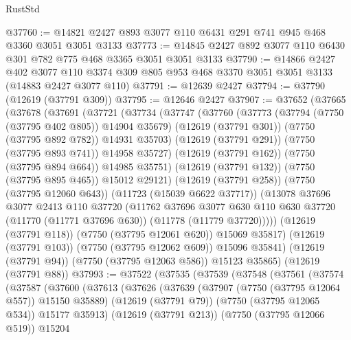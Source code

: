 \begin{lexlean}{RustStd}
\begin{coremodule}
@37760 := @14821 @2427 @893 @3077 @110 @6431 @291 @741 @945 @468 @3360 @3051 @3051 @3133
@37773 := @14845 @2427 @892 @3077 @110 @6430 @301 @782 @775 @468 @3365 @3051 @3051 @3133
@37790 := @14866
    @2427
    @402
    @3077
    @110
    @3374
    @309
    @805
    @953
    @468
    @3370
    @3051
    @3051
    @3133
    (@14883 @2427 @3077 @110)
@37791 := @12639 @2427
@37794 := @37790 (@12619 (@37791 @309))
@37795 := @12646 @2427
@37907 := @37652
    (@37665
      (@37678
        (@37691
          (@37721
            (@37734
              (@37747
                (@37760
                  (@37773
                    (@37794 (@7750 (@37795 @402 @805)) @14904 @35679)
                    (@12619 (@37791 @301))
                    (@7750 (@37795 @892 @782))
                    @14931
                    @35703)
                  (@12619 (@37791 @291))
                  (@7750 (@37795 @893 @741))
                  @14958
                  @35727)
                (@12619 (@37791 @162))
                (@7750 (@37795 @894 @664))
                @14985
                @35751)
              (@12619 (@37791 @132))
              (@7750 (@37795 @895 @465))
              @15012
              @29121)
            (@12619 (@37791 @258))
            (@7750 (@37795 @12060 @643))
            (@11723 (@15039 @6622 @37717))
            (@13078
              @37696
              @3077
              @2413
              @110
              @37720
              (@11762
                @37696
                @3077
                @630
                @110
                @630
                @37720
                (@11770 (@11771 @37696 @630))
                (@11778 (@11779 @37720)))))
          (@12619 (@37791 @118))
          (@7750 (@37795 @12061 @620))
          @15069
          @35817)
        (@12619 (@37791 @103))
        (@7750 (@37795 @12062 @609))
        @15096
        @35841)
      (@12619 (@37791 @94))
      (@7750 (@37795 @12063 @586))
      @15123
      @35865)
    (@12619 (@37791 @88))
@37993 := @37522
    (@37535
      (@37539
        (@37548
          (@37561
            (@37574
              (@37587
                (@37600
                  (@37613
                    (@37626
                      (@37639
                        (@37907 (@7750 (@37795 @12064 @557)) @15150 @35889)
                        (@12619 (@37791 @79))
                        (@7750 (@37795 @12065 @534))
                        @15177
                        @35913)
                      (@12619 (@37791 @213))
                      (@7750 (@37795 @12066 @519))
                      @15204

\end{coremodule}
\end{lexlean}

